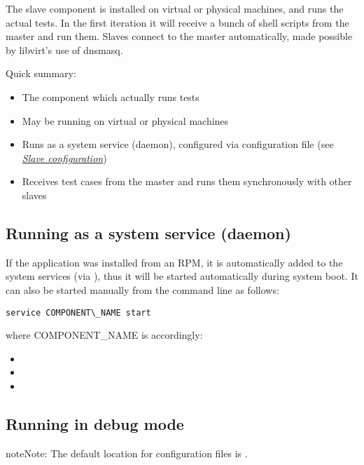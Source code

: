 \documentclass[a4paper,11pt,openany]{sphinxmanual}
\begin{document}
The slave component is installed on virtual or physical machines, and runs the
actual tests. In the first iteration it will receive a bunch of shell scripts
from the master and run them. Slaves connect to the master automatically, made
possible by libvirt's use of dnsmasq.

Quick summary:
\begin{itemize}
\item {} 
The component which actually runs tests

\item {} 
May be running on virtual or physical machines

\item {} 
Runs as a system service (daemon), configured via configuration file (see
{\hyperref[config-slave::doc]{\emph{Slave configuration}}})

\item {} 
Receives test cases from the master and runs them synchronously with other
slaves

\end{itemize}


\subsection{Running as a system service (daemon)}
\label{general-overview:running-as-a-system-service-daemon}
If the application was installed from an RPM, it is automatically added to the
system services (via ), thus it will be started automatically
during system boot. It can also be started manually from the command line as
follows:

\begin{Verbatim}[commandchars=\\\{\}]
service COMPONENT\_NAME start
\end{Verbatim}

where COMPONENT\_NAME is accordingly:
\begin{itemize}
\item {} 

\item {} 

\item {} 

\end{itemize}


\subsection{Running in debug mode}
\label{general-overview:running-in-debug-mode}
\begin{notice}{note}{Note:}
The default location for configuration files is
.
\end{notice}
\end{document}
